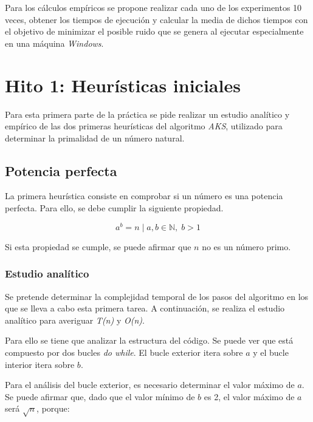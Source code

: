 \documentclass{uc3mpracticas}
\begin{document}
  \vspace{2mm}

  Para los cálculos empíricos se propone realizar cada uno de los experimentos 10 veces, obtener los tiempos de ejecución y calcular la media de dichos tiempos con el objetivo de minimizar el posible ruido que se genera al ejecutar especialmente en una máquina \textit{Windows}.


  \section{Hito 1: Heurísticas iniciales}

  Para esta primera parte de la práctica se pide realizar un estudio analítico y empírico de las dos primeras heurísticas del algoritmo \textit{AKS}, utilizado para determinar la primalidad de un número natural.

  \vspace{2mm}




  \subsection{Potencia perfecta}

  La primera heurística consiste en comprobar si un número es una potencia perfecta. Para ello, se debe cumplir la siguiente propiedad.

  $$ a^b = n \; | \; a, b \in \mathbb{N}, \; b>1$$

  Si esta propiedad se cumple, se puede afirmar que $n$ no es un número primo.


  \subsubsection{Estudio analítico}
  Se pretende determinar la complejidad temporal de los pasos del algoritmo en los que se lleva a cabo esta primera tarea. A continuación, se realiza el estudio analítico para averiguar \textit{T(n)} y \textit{O(n)}.

  \vspace{2mm}

  Para ello se tiene que analizar la estructura del código. Se puede ver que está compuesto por dos bucles \textit{do while}. El bucle exterior itera sobre $a$ y el bucle interior itera sobre $b$.

  \vspace{2mm}

  Para el análisis del bucle exterior, es necesario determinar el valor máximo de $a$.
  Se puede afirmar que, dado que el valor mínimo de $b$ es 2, el valor máximo de $a$ será $\sqrt{n}$, porque:
\end{document}
